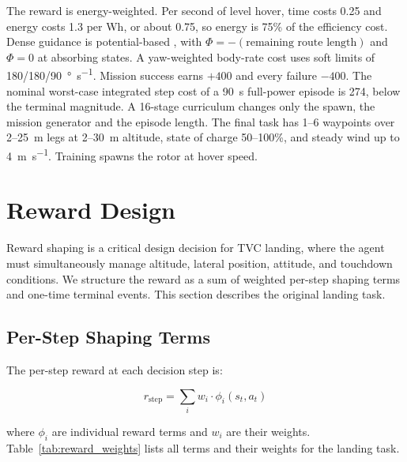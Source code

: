 \documentclass[conference]{IEEEtran}
\begin{document}
The reward is energy-weighted. Per second of level hover, time costs 0.25 and energy costs 1.3 per Wh, or about 0.75, so energy is 75\% of the efficiency cost. Dense guidance is potential-based \cite{b27}, with $\Phi = -(\text{remaining route length})$ and $\Phi = 0$ at absorbing states. A yaw-weighted body-rate cost uses soft limits of 180/180/\SI{90}{\degree\per\second}. Mission success earns $+400$ and every failure $-400$. The nominal worst-case integrated step cost of a \SI{90}{\second} full-power episode is 274, below the terminal magnitude. A 16-stage curriculum changes only the spawn, the mission generator and the episode length. The final task has 1--6 waypoints over 2--\SI{25}{\metre} legs at 2--\SI{30}{\metre} altitude, state of charge 50--100\%, and steady wind up to \SI{4}{\metre\per\second}. Training spawns the rotor at hover speed.


\section{Reward Design}

Reward shaping is a critical design decision for TVC landing, where the agent must simultaneously manage altitude, lateral position, attitude, and touchdown conditions. We structure the reward as a sum of weighted per-step shaping terms and one-time terminal events. This section describes the original landing task.

\subsection{Per-Step Shaping Terms}

The per-step reward at each decision step is:

\begin{equation}
r_{\text{step}} = \sum_{i} w_i \cdot \phi_i(s_t, a_t)
\label{eq:step_reward}
\end{equation}

\noindent where $\phi_i$ are individual reward terms and $w_i$ are their weights. Table~\ref{tab:reward_weights} lists all terms and their weights for the landing task.
\end{document}
